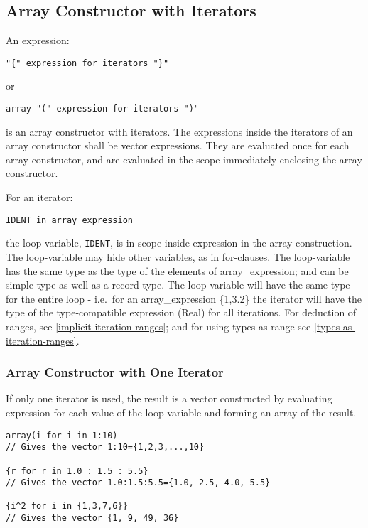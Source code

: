 \subsection{Array Constructor with Iterators}

An expression:
\begin{lstlisting}[language=grammar]
"{" expression for iterators "}"
\end{lstlisting}
or
\begin{lstlisting}[language=grammar]
array "(" expression for iterators ")"
\end{lstlisting}

is an array constructor with iterators. The expressions inside the
iterators of an array constructor shall be vector expressions. They are
evaluated once for each array constructor, and are evaluated in the
scope immediately enclosing the array constructor.

For an iterator:
\begin{lstlisting}[language=modelica]
IDENT in array_expression
\end{lstlisting}

the loop-variable, \lstinline!IDENT!, is in scope inside expression in the array
construction. The loop-variable may hide other variables, as in
for-clauses. The loop-variable has the same type as the type of the
elements of array\_expression; and can be simple type as well as a
record type. The loop-variable will have the same type for the entire
loop - i.e.\ for an array\_expression \{1,3.2\} the iterator will have
the type of the type-compatible expression (Real) for all iterations.
For deduction of ranges, see \autoref{implicit-iteration-ranges}; and for using types as
range see \autoref{types-as-iteration-ranges}.

\subsubsection{Array Constructor with One Iterator}

If only one iterator is used, the result is a vector constructed by
evaluating expression for each value of the loop-variable and forming an
array of the result.

\begin{example}
\begin{lstlisting}[language=modelica]
array(i for i in 1:10)
// Gives the vector 1:10={1,2,3,...,10}

{r for r in 1.0 : 1.5 : 5.5}
// Gives the vector 1.0:1.5:5.5={1.0, 2.5, 4.0, 5.5}

{i^2 for i in {1,3,7,6}}
// Gives the vector {1, 9, 49, 36}
\end{lstlisting}
\end{example}

